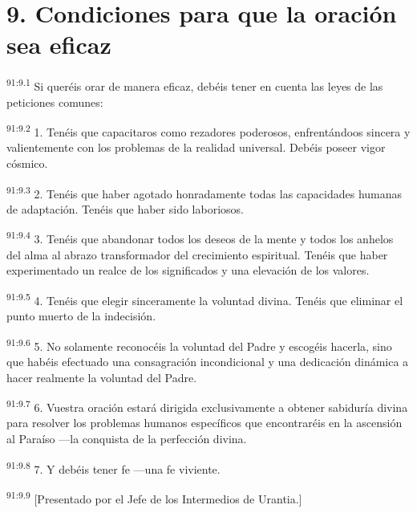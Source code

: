 \documentclass[twoside, 11pt]{book}
\begin{document}
\section*{9. Condiciones para que la oración sea eficaz}
\par
\textsuperscript{91:9.1} Si queréis orar de manera eficaz, debéis tener en cuenta las leyes de las peticiones comunes:

\par
\textsuperscript{91:9.2} 1. Tenéis que capacitaros como rezadores poderosos, enfrentándoos sincera y valientemente con los problemas de la realidad universal. Debéis poseer vigor cósmico.

\par
\textsuperscript{91:9.3} 2. Tenéis que haber agotado honradamente todas las capacidades humanas de adaptación. Tenéis que haber sido laboriosos.

\par
\textsuperscript{91:9.4} 3. Tenéis que abandonar todos los deseos de la mente y todos los anhelos del alma al abrazo transformador del crecimiento espiritual. Tenéis que haber experimentado un realce de los significados y una elevación de los valores.

\par
\textsuperscript{91:9.5} 4. Tenéis que elegir sinceramente la voluntad divina. Tenéis que eliminar el punto muerto de la indecisión.

\par
\textsuperscript{91:9.6} 5. No solamente reconocéis la voluntad del Padre y escogéis hacerla, sino que habéis efectuado una consagración incondicional y una dedicación dinámica a hacer realmente la voluntad del Padre.

\par
\textsuperscript{91:9.7} 6. Vuestra oración estará dirigida exclusivamente a obtener sabiduría divina para resolver los problemas humanos específicos que encontraréis en la ascensión al Paraíso ---la conquista de la perfección divina.

\par
\textsuperscript{91:9.8} 7. Y debéis tener fe ---una fe viviente.

\par
\textsuperscript{91:9.9} [Presentado por el Jefe de los Intermedios de Urantia.]
\end{document}
